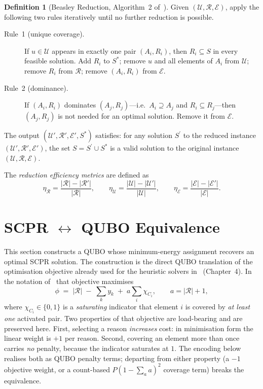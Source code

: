 \documentclass[11pt,a4paper]{article}
\theoremstyle{plain}
\theoremstyle{definition}
\newtheorem{definition}[theorem]{Definition}
\theoremstyle{remark}
\newcommand{\U}{\mathcal{U}}
\newcommand{\R}{\mathcal{R}}
\newcommand{\E}{\mathcal{E}}
\newcommand{\Sstar}{S^{*}}
\newcommand{\Sprime}{S^{\prime}}
\newcommand{\SCPR}{\textup{SCPR}}
\newcommand{\QUBO}{\textup{QUBO}}
\newcommand{\abs}[1]{\lvert #1 \rvert}
\newcommand{\set}[1]{\{#1\}}
\newcommand{\etaR}{\eta_{\mathcal{R}}}
\newcommand{\etaU}{\eta_{\mathcal{U}}}
\newcommand{\etaE}{\eta_{\mathcal{E}}}
\begin{document}
\begin{definition}[Beasley Reduction, Algorithm~2 of~\cite{babatunde2025thesis}]
\label{def:beasley}
Given $(\U, \R, \E)$, apply the following two rules iteratively until no further
reduction is possible.
\begin{description}
  \item[Rule~1 (unique coverage).] If $u \in \U$ appears in exactly one pair
        $(A_i, R_i)$, then $R_i \subseteq S$ in every feasible solution.
        Add $R_i$ to $\Sstar$; remove $u$ and all elements of $A_i$ from $\U$;
        remove $R_i$ from $\R$; remove $(A_i, R_i)$ from $\E$.
  \item[Rule~2 (dominance).] If $(A_i, R_i)$ dominates $(A_j, R_j)$---i.e.\
        $A_i \supseteq A_j$ and $R_i \subseteq R_j$---then $(A_j, R_j)$ is not
        needed for an optimal solution. Remove it from $\E$.
\end{description}
The output $(\U', \R', \E', \Sstar)$ satisfies: for any solution $\Sprime$ to
the reduced instance $(\U', \R', \E')$, the set $S = \Sprime \cup \Sstar$ is a
valid solution to the original instance $(\U, \R, \E)$.
\end{definition}

The \emph{reduction efficiency metrics} are defined as
\[
  \etaR = \frac{\abs{\R} - \abs{\R'}}{\abs{\R}},
  \qquad
  \etaU = \frac{\abs{\U} - \abs{\U'}}{\abs{\U}},
  \qquad
  \etaE = \frac{\abs{\E} - \abs{\E'}}{\abs{\E}}.
\]

\section{\SCPR{} \texorpdfstring{$\leftrightarrow$}{<->} \QUBO{} Equivalence}
\label{sec:equivalence}

This section constructs a \QUBO{} whose minimum-energy assignment recovers an
optimal \SCPR{} solution. The construction is the direct \QUBO{} translation of
the optimisation objective already used for the heuristic solvers
in~\cite{babatunde2025thesis} (Chapter~4). In the notation
of~\cite{babatunde2025thesis} that objective maximises
\[
  \phi \;=\; \abs{\R} \;-\; \sum_{k} y_k \;+\; a \sum_{i} \chi_{C_i},
  \qquad a = \abs{\R} + 1,
\]
where $\chi_{C_i} \in \set{0,1}$ is a \emph{saturating} indicator that element
$i$ is covered by \emph{at least one} activated pair. Two properties of that
objective are load-bearing and are preserved here. First, selecting a reason
\emph{increases} cost: in minimisation form the linear weight is $+1$ per reason.
Second, covering an element more than once carries \emph{no} penalty, because the
indicator saturates at $1$. The encoding below realises both as \QUBO{} penalty
terms; departing from either property (a $-1$ objective weight, or a count-based
$P(1-\sum_a a)^2$ coverage term) breaks the equivalence.
\end{document}
